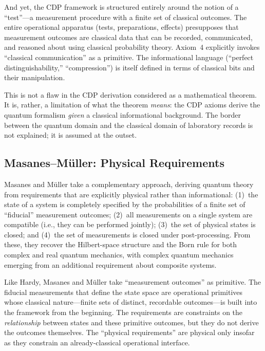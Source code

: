 \documentclass[pdflatex,sn-mathphys-num]{sn-jnl}%
\begin{document}
And yet, the CDP framework is structured entirely around the notion of a ``test''---a measurement procedure with a finite set of classical outcomes. The entire operational apparatus (tests, preparations, effects) presupposes that measurement outcomes are classical data that can be recorded, communicated, and reasoned about using classical probability theory. Axiom~4 explicitly invokes ``classical communication'' as a primitive. The informational language (``perfect distinguishability,'' ``compression'') is itself defined in terms of classical bits and their manipulation.

This is not a flaw in the CDP derivation considered as a mathematical theorem. It is, rather, a limitation of what the theorem \emph{means}: the CDP axioms derive the quantum formalism \emph{given} a classical informational background. The border between the quantum domain and the classical domain of laboratory records is not explained; it is assumed at the outset.

\subsection{Masanes--M\"{u}ller: Physical Requirements}

Masanes and M\"{u}ller \cite{Masanes2011} take a complementary approach, deriving quantum theory from requirements that are explicitly physical rather than informational: (1)~the state of a system is completely specified by the probabilities of a finite set of ``fiducial'' measurement outcomes; (2)~all measurements on a single system are compatible (i.e., they can be performed jointly); (3)~the set of physical states is closed; and (4)~the set of measurements is closed under post-processing. From these, they recover the Hilbert-space structure and the Born rule for both complex and real quantum mechanics, with complex quantum mechanics emerging from an additional requirement about composite systems.

Like Hardy, Masanes and M\"{u}ller take ``measurement outcomes'' as primitive. The fiducial measurements that define the state space are operational primitives whose classical nature---finite sets of distinct, recordable outcomes---is built into the framework from the beginning. The requirements are constraints on the \emph{relationship} between states and these primitive outcomes, but they do not derive the outcomes themselves. The ``physical requirements'' are physical only insofar as they constrain an already-classical operational interface.
\end{document}
